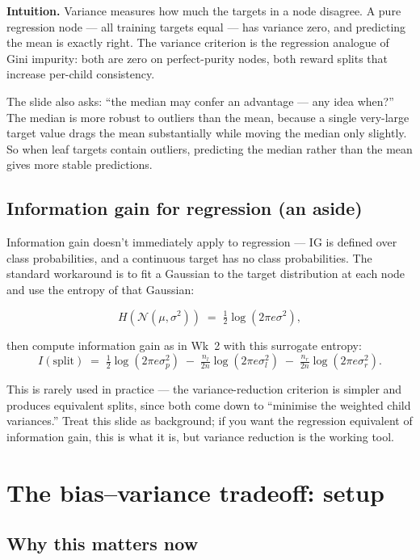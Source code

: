 \documentclass[11pt, a4paper]{article}
\begin{document}
\textbf{Intuition.} Variance measures how much the targets in a node disagree. A pure regression node — all training targets equal — has variance zero, and predicting the mean is exactly right. The variance criterion is the regression analogue of Gini impurity: both are zero on perfect-purity nodes, both reward splits that increase per-child consistency.

\begin{notebox}
The slide also asks: ``the median may confer an advantage — any idea when?'' The median is more robust to outliers than the mean, because a single very-large target value drags the mean substantially while moving the median only slightly. So when leaf targets contain outliers, predicting the median rather than the mean gives more stable predictions.
\end{notebox}

\subsection{Information gain for regression (an aside)}

Information gain doesn't immediately apply to regression — IG is defined over class probabilities, and a continuous target has no class probabilities. The standard workaround is to fit a Gaussian to the target distribution at each node and use the entropy of that Gaussian:

\[
H(\mathcal{N}(\mu, \sigma^2)) \;=\; \tfrac{1}{2}\log(2\pi e \sigma^2),
\]

then compute information gain as in Wk~2 with this surrogate entropy:
\[
I(\text{split}) \;=\; \tfrac{1}{2}\log(2\pi e \sigma_p^2) \;-\; \tfrac{n_l}{2n}\log(2\pi e \sigma_l^2) \;-\; \tfrac{n_r}{2n}\log(2\pi e \sigma_r^2).
\]

This is rarely used in practice — the variance-reduction criterion is simpler and produces equivalent splits, since both come down to ``minimise the weighted child variances.'' Treat this slide as background; if you want the regression equivalent of information gain, this is what it is, but variance reduction is the working tool.

\section{The bias--variance tradeoff: setup}

\subsection{Why this matters now}
\end{document}
